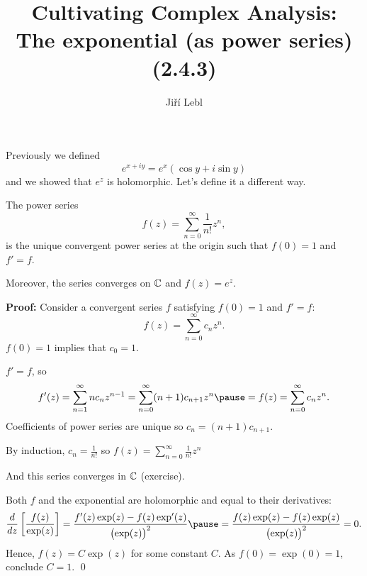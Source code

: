 \documentclass[10pt,aspectratio=169]{beamer}
\author{Ji\v{r}\'i Lebl}
\institute[OSU]{%
Departemento pri Matematiko de Oklahoma {\^S}tata Universitato}
\title{Cultivating Complex Analysis:\\%
The exponential (as power series) (2.4.3)}
\date{}
\begin{document}
\begin{frame}
\titlepage
\end{frame}

\begin{frame}
Previously we defined
\[
e^{x+iy}
= e^x (\cos y + i \sin y)
\]
and we showed that $e^z$ is holomorphic. \pause Let's define it a different
way.

\medskip
\pause

\begin{proposition}
The power series
\begin{equation*}
f(z) = \sum_{n=0}^\infty \frac{1}{n!} z^n ,
\end{equation*}
is the unique convergent power series at the origin
such that $f(0)=1$ and $f'=f$.
\pause

Moreover, the series converges on ${\mathbb{C}}$ and
$f(z) = e^z$.
\end{proposition}

\pause

\textbf{Proof:}
Consider a convergent series $f$ satisfying $f(0)=1$ and $f'=f$:
\[
f(z) = \sum_{n=0}^\infty c_n z^n .
\]
\pause
$f(0)=1$ implies that $c_0 = 1$.

\end{frame}

\begin{frame}
$f' = f$, so  \pause
\[
f'(z) =
\sum_{n=1}^\infty n c_n z^{n-1} =
\sum_{n=0}^\infty (n+1) c_{n+1} z^{n} 
\pause
=
f(z) = \sum_{n=0}^\infty c_n z^n .
\]
\pause
Coefficients of power series are unique  so $c_n = (n+1) c_{n+1}$.

\pause
By induction, $c_n = \frac{1}{n!}$ so
\(\displaystyle f(z) = \sum_{n=0}^\infty \frac{1}{n!} z^n \)

\pause
And this series converges in ${\mathbb{C}}$ (exercise).

\pause
\medskip

Both $f$ and the exponential are holomorphic and equal to their derivatives:
\pause
\[
\frac{d}{dz} \left[ \frac{f(z)}{\exp(z)} \right]
=
\frac{f'(z)\exp(z) - f(z) \exp'(z)}{{\bigl(\exp(z)\bigr)}^2}
\pause
=
\frac{f(z)\exp(z) - f(z) \exp(z)}{{\bigl(\exp(z)\bigr)}^2}
= 0.
\]
\pause
Hence, $f(z) = C \exp(z)$ for some constant $C$.
\pause
As $f(0) = \exp(0) = 1$, conclude $C=1$.
\qed
\end{frame}
\end{document}
